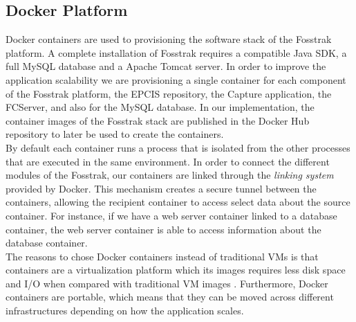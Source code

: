 \subsection{Docker Platform}
\label{sub:impl_docker}
Docker containers are used to provisioning the software stack of the Fosstrak platform. A complete
installation of Fosstrak requires a compatible Java \gls{SDK}, a full MySQL database and a Apache Tomcat
server. In order to improve the application scalability we are provisioning a single container for each
component of the Fosstrak platform, the \gls{EPCIS} repository, the Capture application, the \gls{FCServer},
and also for the MySQL database. In our implementation, the container images of the Fosstrak stack
are published in the Docker Hub repository to later be used to create the containers.\\

By default each container runs a process that is isolated from the other processes that are executed
in the same environment. In order to connect the different modules of the Fosstrak, our containers are
linked through the \textit{linking system} provided by Docker. This mechanism creates a secure tunnel
between the containers, allowing the recipient container to access select data about the source container.
For instance, if we have a web server container linked to a database container, the web server container
is able to access information about the database container.\\

The reasons to chose Docker containers instead of traditional \glspl{VM} is that containers are a
virtualization platform which its images requires less disk space and I/O when compared with traditional
\gls{VM} images \cite{merkel2014docker}. Furthermore, Docker containers are portable, which means that
they can be moved across different infrastructures depending on how the application scales.
